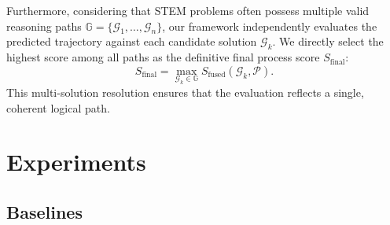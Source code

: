 \documentclass[11pt]{article}
\begin{document}
Furthermore, considering that STEM problems often possess multiple valid reasoning paths $\mathbb{G} = \{\mathcal{G}_1, \dots, \mathcal{G}_n\}$, our framework independently evaluates the predicted trajectory against each candidate solution $\mathcal{G}_k$. We directly select the highest score among all paths as the definitive final process score $S_{\text{final}}$:
\begin{equation}
S_{\text{final}} = \max_{\mathcal{G}_k \in \mathbb{G}} S_{\text{fused}}(\mathcal{G}_k, \mathcal{P}).
\end{equation}
This multi-solution resolution ensures that the evaluation reflects a single, coherent logical path.

\section{Experiments}
\label{sec:experiments}



\subsection{Baselines}
\label{sec:baselines}
\end{document}
